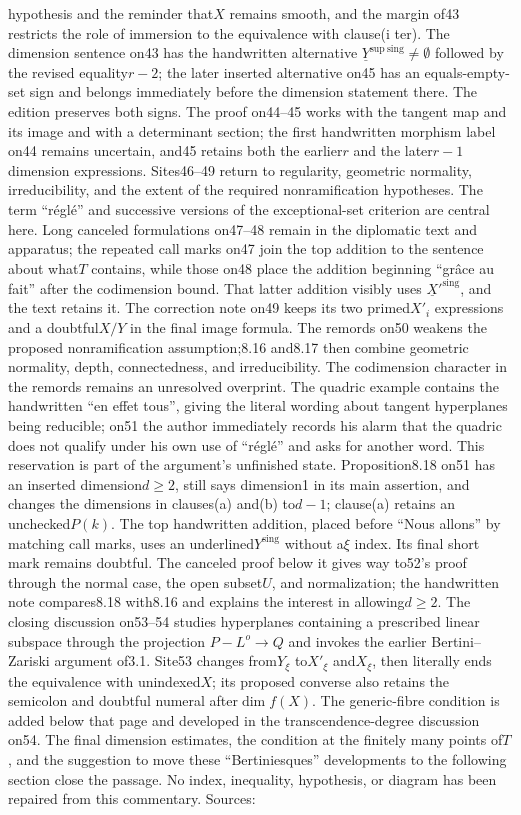 hypothesis and the reminder that$X$ remains smooth, and the margin of43 restricts the role of immersion to the equivalence with clause(i ter). The dimension sentence on43 has the handwritten alternative $\underline{Y}^{\mathrm{sup\ sing}}\neq\emptyset$ followed by the revised equality$r-2$; the later inserted alternative on45 has an equals-empty-set sign and belongs immediately before the dimension statement there. The edition preserves both signs. The proof on44--45 works with the tangent map and its image and with a determinant section; the first handwritten morphism label on44 remains uncertain, and45 retains both the earlier$r$ and the later$r-1$ dimension expressions. Sites46--49 return to regularity, geometric normality, irreducibility, and the extent of the required nonramification hypotheses. The term ``réglé'' and successive versions of the exceptional-set criterion are central here. Long canceled formulations on47--48 remain in the diplomatic text and apparatus; the repeated call marks on47 join the top addition to the sentence about what$T$ contains, while those on48 place the addition beginning ``grâce au fait'' after the codimension bound. That latter addition visibly uses $\underline{X}'^{\mathrm{sing}}$, and the text retains it. The correction note on49 keeps its two primed$X'_i$ expressions and a doubtful$X/Y$ in the final image formula. The remords on50 weakens the proposed nonramification assumption;8.16 and8.17 then combine geometric normality, depth, connectedness, and irreducibility. The codimension character in the remords remains an unresolved overprint. The quadric example contains the handwritten ``en effet tous'', giving the literal wording about tangent hyperplanes being reducible; on51 the author immediately records his alarm that the quadric does not qualify under his own use of ``réglé'' and asks for another word. This reservation is part of the argument's unfinished state. Proposition8.18 on51 has an inserted dimension$d\geq2$, still says dimension1 in its main assertion, and changes the dimensions in clauses(a) and(b) to$d-1$; clause(a) retains an unchecked$P(k)$. The top handwritten addition, placed before ``Nous allons'' by matching call marks, uses an underlined$Y^{\mathrm{sing}}$ without a$\xi$ index. Its final short mark remains doubtful. The canceled proof below it gives way to52's proof through the normal case, the open subset$U$, and normalization; the handwritten note compares8.18 with8.16 and explains the interest in allowing$d\geq2$. The closing discussion on53--54 studies hyperplanes containing a prescribed linear subspace through the projection $P-L^o\to Q$ and invokes the earlier Bertini--Zariski argument of3.1. Site53 changes from$Y_\xi$ to$X'_\xi$ and$X_\xi$, then literally ends the equivalence with unindexed$X$; its proposed converse also retains the semicolon and doubtful numeral after$\dim f(X)$. The generic-fibre condition is added below that page and developed in the transcendence-degree discussion on54. The final dimension estimates, the condition at the finitely many points of$T$, and the suggestion to move these ``Bertiniesques'' developments to the following section close the passage. No index, inequality, hypothesis, or diagram has been repaired from this commentary. Sources: 